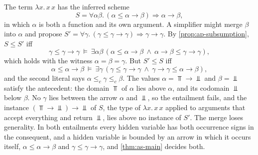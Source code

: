 \begin{example}\label{ex:ap-selfapp}
The term $\lambda x.\,x\,x$ has the inferred scheme
\[
 S=\forall\alpha\beta.\,(\alpha\le\alpha\to\beta)\Rightarrow\alpha\to\beta,
\]
in which $\alpha$ is both a function and its own argument. A simplifier might
merge $\beta$ into $\alpha$ and propose
$S'=\forall\gamma.\,(\gamma\le\gamma\to\gamma)\Rightarrow\gamma\to\gamma$.
By \cref{prop:ap-subsumption}, $S\le S'$ iff
\[
 \gamma\le\gamma\to\gamma\ \models\ \exists\alpha\beta\,
 (\alpha\le\alpha\to\beta\ \wedge\ \alpha\to\beta\le\gamma\to\gamma),
\]
which holds with the witness $\alpha=\beta=\gamma$. But $S'\le S$ iff
\[
 \alpha\le\alpha\to\beta\ \models\ \exists\gamma\,
 (\gamma\le\gamma\to\gamma\ \wedge\ \gamma\to\gamma\le\alpha\to\beta),
\]
and the second literal says $\alpha\le_c\gamma\le_c\beta$. The values
$\alpha=\Top\to\Bot$ and $\beta=\Bot$ satisfy the antecedent: the domain $\Top$
of $\alpha$ lies above $\alpha$, and its codomain $\Bot$ below $\beta$. No
$\gamma$ lies between the arrow $\alpha$ and $\Bot$, so the entailment fails, and
the instance $(\Top\to\Bot)\to\Bot$ of $S$, the type of $\lambda x.\,x\,x$ applied
to arguments that accept everything and return $\Bot$, lies above no instance
of $S'$. The merge loses generality. In both entailments every hidden variable
has both occurrence signs in the consequent, and a hidden variable is bounded
by an arrow in which it occurs itself, $\alpha\le\alpha\to\beta$ and
$\gamma\le\gamma\to\gamma$, and \cref{thm:as-main} decides both.
\end{example}

